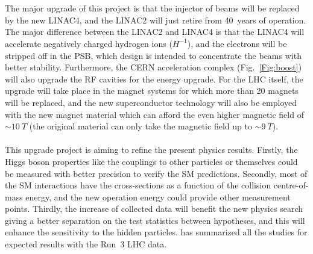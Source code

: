 \noindent
\\
\\The major upgrade of this project is that the injector of beams will be replaced by the new LINAC4, and the LINAC2 will just retire from 40~years of operation. The major difference between the LINAC2 and LINAC4 is that the LINAC4 will accelerate negatively charged hydrogen ions ($H^{-1}$), and the electrons will be stripped off in the PSB, which design is intended to concentrate the beams with better stability\cite{LINAC4}. Furthermore, the CERN acceleration complex (Fig.~\ref{Fig:boost}) will also upgrade the RF cavities for the energy upgrade. For the LHC itself, the upgrade will take place in the magnet systems for which more than 20 magnets will be replaced, and the new superconductor technology will also be employed with the new magnet material which can afford the even higher magnetic field of $\sim 10~T$ (the original material can only take the magnetic field up to $\sim 9~T$)\cite{LINAC4}. 
\\
\\This upgrade project is aiming to refine the present physics results. Firstly, the Higgs boson properties like the couplings to other particles or themselves could be measured with better precision to verify the SM predictions. Secondly, most of the SM interactions have the cross-sections as a function of the collision centre-of-mass energy, and the new operation energy could provide other measurement points. Thirdly, the increase of collected data will benefit the new physics search giving a better separation on the test statistics between hypotheses, and this will enhance the sensitivity to the hidden particles. \cite{Atlas:2019qfx} has summarized all the studies for expected results with the Run~3 LHC data.
